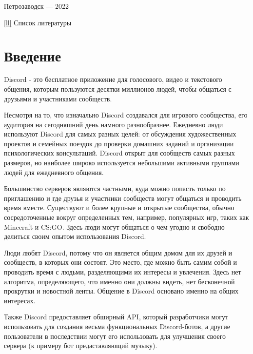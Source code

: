 \documentclass[a4paper,12pt]{article}
\begin{document}
\vfill

\begin{center}
\large
    Петрозаводск --- 2022
\end{center}




\newpage
\tableofcontents
\ref{ll}{ Список литературы}

\newpage
\section*{Введение}
\large {

Discord - это бесплатное приложение для голосового, видео и текстового общения, которым пользуются десятки миллионов людей, чтобы общаться с друзьями и участниками сообществ.

Несмотря на то, что изначально Discord создавался для игрового сообщества, его аудитория на сегодняшний день намного разнообразнее. Ежедневно люди используют Discord для самых разных целей: от обсуждения художественных проектов и семейных поездок до проверки домашних заданий и организации психологических консультаций. Discord открыт для сообществ самых разных размеров, но наиболее широко используется небольшими активными группами людей для ежедневного общения.

Большинство серверов являются частными, куда можно попасть только по приглашению и где друзья и участники сообществ могут общаться и проводить время вместе. Существуют и более крупные и открытые сообщества, обычно сосредоточенные вокруг определенных тем, например, популярных игр, таких как Minecraft и CS:GO. Здесь люди могут общаться о чем угодно и свободно делиться своим опытом использования Discord.

Люди любят Discord, потому что он является общим домом для их друзей и сообществ, в которых они состоят. Это место, где можно быть самим собой и проводить время с людьми, разделяющими их интересы и увлечения. Здесь нет алгоритма, определяющего, что именно они должны видеть, нет бесконечной прокрутки и новостной ленты. Общение в Discord основано именно на общих интересах.

Также Discord предоставляет обширный API, который разработчики могут использовать для создания весьма функциональных Discord-ботов, а другие пользователи в последствии могут его использовать для улучшения своего сервера (к примеру бот предаставляющий музыку).

}
\end{document}
